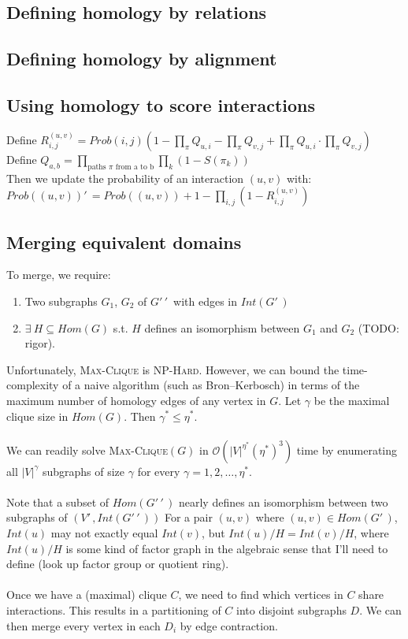 \documentclass[11pt]{article}
\begin{document}
\subsection*{Defining homology by relations}

\subsection*{Defining homology by alignment}

\subsection*{Using homology to score interactions}

Define
$R_{i,j}^{(u,v)} = Prob(i,j) \left(1 - \displaystyle \prod_\pi Q_{u,i} - \prod_\pi Q_{v,j} + \prod_\pi Q_{u,i} \cdot \prod_\pi Q_{v,j} \right)$\\
Define $Q_{a,b} = \displaystyle \prod_{\text{paths } \pi \text{ from a to b}} \prod_{k} (1 - S(\pi_k))$\\
Then we update the probability of an interaction $(u,v)$ with:\\
$Prob((u,v))'\,\! = Prob((u,v)) + 1 - \displaystyle \prod_{i,j}(1 - R_{i,j}^{(u,v)})$

\subsection*{Merging equivalent domains}

To merge, we require:
\begin{enumerate}
\item Two subgraphs $G_1$, $G_2$ of $G'\,\!'\,\!$ with edges in $Int(G'\,\!)$
\item $\exists \: H \subseteq Hom(G)$ s.t. $H$ defines an isomorphism between $G_1$ and $G_2$ (TODO: rigor).
\end{enumerate}
Unfortunately, \textsc{Max-Clique} is \textsc{NP-Hard}. However, we can bound the time-complexity of a naive algorithm (such as Bron--Kerbosch) in terms of the maximum number of homology edges of any vertex in $G$. Let $\gamma$ be the maximal clique size in $Hom(G)$. Then $\gamma^* \leq \eta^*$.\\\\
We can readily solve \textsc{Max-Clique}$(G)$ in $\mathcal O(|V|^{\eta^*}(\eta^*)^3)$ time by enumerating all $|V|^{\gamma}$ subgraphs of size $\gamma$ for every $\gamma = 1, 2, \ldots, \eta^*$.\\\\
Note that a subset of $Hom(G'\,\!'\,\!)$ nearly defines an isomorphism between two subgraphs of $(V'\,\!, Int(G'\,\!'\,\!))$ For a pair $(u,v)$ where $(u,v) \in Hom(G'\,\!)$, $Int(u)$ may not exactly equal $Int(v)$, but $Int(u) / H = Int(v) / H$, where $Int(u) / H$ is some kind of factor graph in the algebraic sense that I'll need to define (look up factor group or quotient ring).\\\\
Once we have a (maximal) clique $C$, we need to find which vertices in $C$ share interactions. This results in a partitioning of $C$ into disjoint subgraphs $D$. We can then merge every vertex in each $D_i$ by edge contraction.
\end{document}
